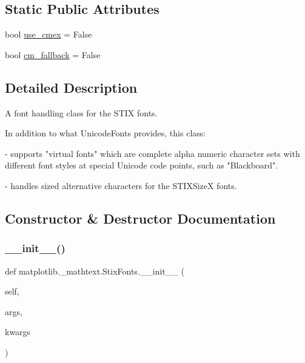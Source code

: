 \subsection*{Static Public Attributes}
\begin{DoxyCompactItemize}
\item 
bool \hyperlink{classmatplotlib_1_1__mathtext_1_1StixFonts_ad468fdfc1c15f9fa9e9c79d8830cf5f5}{use\+\_\+cmex} = False
\item 
bool \hyperlink{classmatplotlib_1_1__mathtext_1_1StixFonts_a5b20175a2d6a6f425b51e5d1578820a8}{cm\+\_\+fallback} = False
\end{DoxyCompactItemize}


\subsection{Detailed Description}
\begin{DoxyVerb}A font handling class for the STIX fonts.

In addition to what UnicodeFonts provides, this class:

- supports "virtual fonts" which are complete alpha numeric
  character sets with different font styles at special Unicode
  code points, such as "Blackboard".

- handles sized alternative characters for the STIXSizeX fonts.
\end{DoxyVerb}
 

\subsection{Constructor \& Destructor Documentation}
\mbox{\label{classmatplotlib_1_1__mathtext_1_1StixFonts_a6c73f99d212154a9ada592425636644b}} 
\subsubsection{\texorpdfstring{\+\_\+\+\_\+init\+\_\+\+\_\+()}{\_\_init\_\_()}}
{\footnotesize\ttfamily def matplotlib.\+\_\+mathtext.\+Stix\+Fonts.\+\_\+\+\_\+init\+\_\+\+\_\+ (\begin{DoxyParamCaption}\item[{}]{self,  }\item[{}]{args,  }\item[{}]{kwargs }\end{DoxyParamCaption})}



